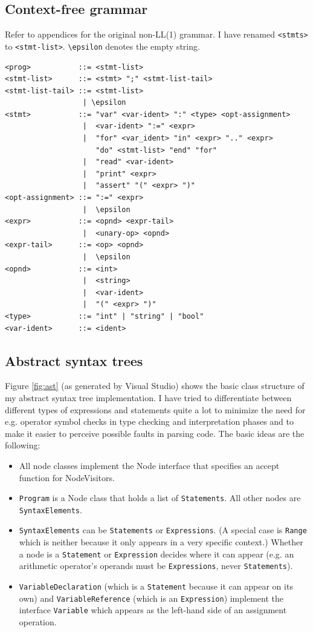 \documentclass[a4paper,11pt]{article}
\begin{document}
\subsection{Context-free grammar}

Refer to appendices for the original non-LL(1) grammar. I have renamed \verb,<stmts>, to \verb,<stmt-list>,. \verb,\epsilon, denotes the empty string.

\begin{verbatim}
<prog>           ::= <stmt-list>
<stmt-list>      ::= <stmt> ";" <stmt-list-tail>
<stmt-list-tail> ::= <stmt-list>
                  | \epsilon
<stmt>           ::= "var" <var-ident> ":" <type> <opt-assignment>
                  |  <var-ident> ":=" <expr>
                  |  "for" <var_ident> "in" <expr> ".." <expr>
                     "do" <stmt-list> "end" "for"
                  |  "read" <var-ident>
                  |  "print" <expr>
                  |  "assert" "(" <expr> ")"
<opt-assignment> ::= ":=" <expr>
                  |  \epsilon
<expr>           ::= <opnd> <expr-tail>
                  |  <unary-op> <opnd>
<expr-tail>      ::= <op> <opnd>
                  |  \epsilon
<opnd>           ::= <int>
                  |  <string>
                  |  <var-ident>
                  |  "(" <expr> ")"
<type>           ::= "int" | "string" | "bool"
<var-ident>      ::= <ident>
\end{verbatim}

\subsection{Abstract syntax trees}

Figure \ref{fig:ast} (as generated by Visual Studio) shows the basic class structure of my abstract syntax tree implementation. I have tried to differentiate between different types of expressions and statements quite a lot to minimize the need for e.g. operator symbol checks in type checking and interpretation phases and to make it easier to perceive possible faults in parsing code. The basic ideas are the following:

\begin{itemize}
    \item All node classes implement the Node interface that specifies an accept function for NodeVisitors.
    \item \verb,Program, is a Node class that holds a list of \verb,Statements,. All other nodes are \verb,SyntaxElements,.
    \item \verb,SyntaxElements, can be \verb,Statements, or \verb,Expressions,. (A special case is \verb,Range, which is neither because it only appears in a very specific context.) Whether a node is a \verb,Statement, or \verb,Expression, decides where it can appear (e.g. an arithmetic operator's operands must be \verb,Expressions,, never \verb,Statements,).
    \item \verb,VariableDeclaration, (which is a \verb,Statement, because it can appear on its own) and \verb,VariableReference, (which is an \verb,Expression,) implement the interface \verb,Variable, which appears as the left-hand side of an assignment operation.
\end{itemize}
\end{document}
